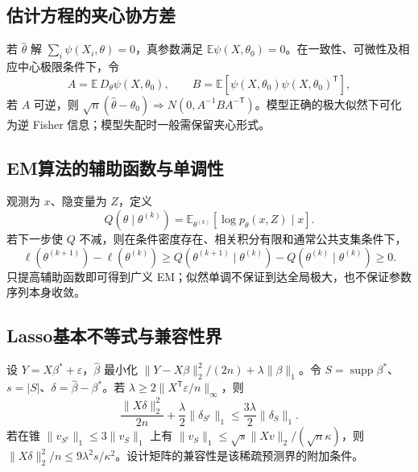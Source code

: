 \documentclass[../main.tex]{subfiles}
\begin{document}
\subsection{估计方程的夹心协方差}
若 $\widehat\theta$ 解 $\sum_i\psi(X_i,\theta)=0$，真参数满足 $\mathbb E\psi(X,\theta_0)=0$。在一致性、可微性及相应中心极限条件下，令
\[
A=\mathbb E\,D_\theta\psi(X,\theta_0),\qquad
B=\mathbb E[\psi(X,\theta_0)\psi(X,\theta_0)^{\mathsf T}],
\]
若 $A$ 可逆，则 $\sqrt n(\widehat\theta-\theta_0)\Rightarrow N(0,A^{-1}BA^{-\mathsf T})$。模型正确的极大似然下可化为逆 Fisher 信息；模型失配时一般需保留夹心形式。
\subsection{EM算法的辅助函数与单调性}
观测为 $x$、隐变量为 $Z$，定义
\[
Q(\theta\mid\theta^{(k)})=
\mathbb E_{\theta^{(k)}}[\log p_\theta(x,Z)\mid x].
\]
若下一步使 $Q$ 不减，则在条件密度存在、相关积分有限和通常公共支集条件下，
\[
\ell(\theta^{(k+1)})-\ell(\theta^{(k)})
\ge Q(\theta^{(k+1)}\mid\theta^{(k)})-Q(\theta^{(k)}\mid\theta^{(k)})\ge0.
\]
只提高辅助函数即可得到广义 EM；似然单调不保证到达全局极大，也不保证参数序列本身收敛。
\newpage
\subsection{Lasso基本不等式与兼容性界}
设 $Y=X\beta^*+\varepsilon$，$\widehat\beta$ 最小化 $\|Y-X\beta\|_2^2/(2n)+\lambda\|\beta\|_1$。令 $S=\operatorname{supp}\beta^*$、$s=|S|$、$\delta=\widehat\beta-\beta^*$。若 $\lambda\ge2\|X^{\mathsf T}\varepsilon/n\|_\infty$，则
\[
\frac{\|X\delta\|_2^2}{2n}+\frac\lambda2\|\delta_{S^c}\|_1
\le\frac{3\lambda}{2}\|\delta_S\|_1.
\]
若在锥 $\|v_{S^c}\|_1\le3\|v_S\|_1$ 上有 $\|v_S\|_1\le\sqrt{s}\|Xv\|_2/(\sqrt n\kappa)$，则 $\|X\delta\|_2^2/n\le9\lambda^2s/\kappa^2$。设计矩阵的兼容性是该稀疏预测界的附加条件。
\clearpage
\end{document}
